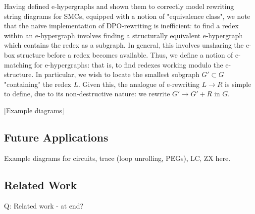 Having defined e-hypergraphs and shown them to correctly model rewriting string diagrams for SMCs, equipped with a notion of "equivalence class", we note that the naive implementation of DPO-rewriting is inefficient: to find a redex within an e-hypergraph involves finding a structurally equivalent e-hypergraph which contains the redex as a subgraph. In general, this involves unsharing the e-box structure before a redex becomes available. Thus, we define a notion of e-matching for e-hypergraphs: that is, to find redexes working modulo the e-structure. In particular, we wish to locate the smallest subgraph $G' \subset G$ "containing" the redex $L$. Given this, the analogue of e-rewriting $L \to R$ is simple to define, due to its non-destructive nature: we rewrite $G' \to G' + R$ in $G$. 

[Example diagrams]

\subsection*{Future Applications}

Example diagrams for circuits, trace (loop unrolling, PEGs), LC, ZX here.

\subsection{Related Work}
Q: Related work - at end? \\